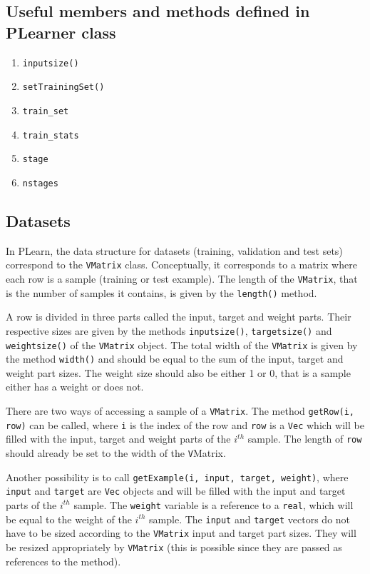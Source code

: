 \documentclass[11pt]{book}
\begin{document}
\subsection{Useful members and methods defined in PLearner class}

\begin{enumerate}
\item {\tt inputsize()}
\item {\tt setTrainingSet()}
\item {\tt train\_set}
\item {\tt train\_stats}
\item {\tt stage}
\item {\tt nstages}
\end{enumerate}

\subsection{\label{plearner_vmat}Datasets}

In PLearn, the data structure for datasets (training, validation
and test sets) correspond to the \texttt{VMatrix} class. 
Conceptually, it corresponds
to a matrix where each row is a sample
(training or test example). The length of the \texttt{VMatrix}, that is
the number of samples it contains, is given by the
\texttt{length()} method. 

A row is divided in three parts called the input,
target and weight parts. Their respective sizes are given
by the methods \texttt{inputsize()}, \texttt{targetsize()}
and \texttt{weightsize()} of the \texttt{VMatrix} object. 
The total width of
the \texttt{VMatrix} is given by the method \texttt{width()} 
and should be equal to the sum of the input, target
and weight part sizes. The weight size should also
be either 1 or 0, that is a sample either
has a weight or does not.

There are two ways of accessing a sample of a \texttt{VMatrix}.
The method {\tt getRow(i, row)} can be called, where {\tt i}
is the index of the row and {\tt row} is a {\tt Vec} which
will be filled with the input, target and weight parts
of the $i^{th}$ sample. The length of {\tt row}
should already be set to the width of the {\texttt VMatrix}.

Another possibility is to call
{\tt getExample(i, input, target, weight)}, where
{\tt input} and {\tt target} are {\tt Vec} objects and
will be filled with the input and target parts of
the $i^{th}$ sample. The {\tt weight} variable is a reference
to a {\tt real}, which will be equal to the weight
of the $i^{th}$ sample. The {\tt input} and {\tt target}
vectors do not have to be sized according to the
{\tt VMatrix} input and target part sizes. They
will be resized appropriately by {\tt VMatrix}
(this is possible since they are passed as
references to the method).
\end{document}

